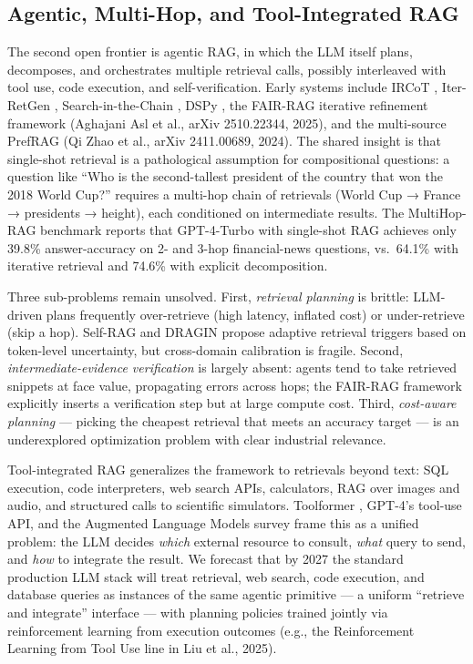 \documentclass{article}
\begin{document}
\subsection{Agentic, Multi-Hop, and Tool-Integrated RAG}\label{agentic-multi-hop-and-tool-integrated-rag}

The second open frontier is agentic RAG, in which the LLM itself plans, decomposes, and orchestrates multiple retrieval calls, possibly interleaved with tool use, code execution, and self-verification. Early systems include IRCoT \citep{trivedi2023interleavingretrie}, Iter-RetGen \citep{shao2023enhancingretrieval}, Search-in-the-Chain \citep{xu2024searchinthechainto}, DSPy \citep{khattab2022demonstratesearchp}, the FAIR-RAG iterative refinement framework (Aghajani Asl et al., arXiv 2510.22344, 2025), and the multi-source PrefRAG (Qi Zhao et al., arXiv 2411.00689, 2024). The shared insight is that single-shot retrieval is a pathological assumption for compositional questions: a question like ``Who is the second-tallest president of the country that won the 2018 World Cup?'' requires a multi-hop chain of retrievals (World Cup → France → presidents → height), each conditioned on intermediate results. The MultiHop-RAG benchmark \citep{tang2024multihopragbenchma} reports that GPT-4-Turbo with single-shot RAG achieves only 39.8\% answer-accuracy on 2- and 3-hop financial-news questions, vs.~64.1\% with iterative retrieval and 74.6\% with explicit decomposition.

Three sub-problems remain unsolved. First, \emph{retrieval planning} is brittle: LLM-driven plans frequently over-retrieve (high latency, inflated cost) or under-retrieve (skip a hop). Self-RAG \citep{asai2024selfraglearningtor} and DRAGIN \citep{su20242024} propose adaptive retrieval triggers based on token-level uncertainty, but cross-domain calibration is fragile. Second, \emph{intermediate-evidence verification} is largely absent: agents tend to take retrieved snippets at face value, propagating errors across hops; the FAIR-RAG framework explicitly inserts a verification step but at large compute cost. Third, \emph{cost-aware planning} --- picking the cheapest retrieval that meets an accuracy target --- is an underexplored optimization problem with clear industrial relevance.

Tool-integrated RAG generalizes the framework to retrievals beyond text: SQL execution, code interpreters, web search APIs, calculators, RAG over images and audio, and structured calls to scientific simulators. Toolformer \citep{schick2023toolformerlanguage}, GPT-4's tool-use API, and the Augmented Language Models survey \citep{mialon2023augmentedlanguagem} frame this as a unified problem: the LLM decides \emph{which} external resource to consult, \emph{what} query to send, and \emph{how} to integrate the result. We forecast that by 2027 the standard production LLM stack will treat retrieval, web search, code execution, and database queries as instances of the same agentic primitive --- a uniform ``retrieve and integrate'' interface --- with planning policies trained jointly via reinforcement learning from execution outcomes (e.g., the Reinforcement Learning from Tool Use line in Liu et al., 2025).
\end{document}
